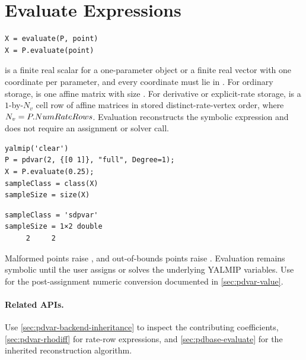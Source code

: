 \section{Evaluate \texorpdfstring{}{pdvar} Expressions}
\label{sec:pdvar-evaluate}

\syntaxhead
\begin{lstlisting}[style=dpsyntax]
X = evaluate(P, point)
X = P.evaluate(point)
\end{lstlisting}

\descriptionhead
{} is a finite real scalar for a one-parameter object or a finite real vector with one coordinate per parameter, and every coordinate must lie in . For ordinary storage,  is one affine  matrix with size . For derivative or explicit-rate storage,  is a $1$-by-$N_v$ cell row of affine matrices in stored distinct-rate-vertex order, where $N_v=P.NumRateRows$. Evaluation reconstructs the symbolic expression and does not require an assignment or solver call.

\par\examplehead
\begin{lstlisting}[style=dpmatlab]
yalmip('clear')
P = pdvar(2, {[0 1]}, "full", Degree=1);
X = P.evaluate(0.25);
sampleClass = class(X)
sampleSize = size(X)
\end{lstlisting}
\begin{lstlisting}[style=dpoutput]
sampleClass = 'sdpvar'
sampleSize = 1×2 double
     2     2
\end{lstlisting}

\remarkshead
Malformed points raise , and out-of-bounds points raise . Evaluation remains symbolic until the user assigns or solves the underlying YALMIP variables. Use  for the post-assignment numeric conversion documented in \cref{sec:pdvar-value}.

\paragraph{Related APIs.}
Use \cref{sec:pdvar-backend-inheritance} to inspect the contributing coefficients, \cref{sec:pdvar-rhodiff} for rate-row expressions, and \cref{sec:pdbase-evaluate} for the inherited reconstruction algorithm.

\section{\texorpdfstring{}{rhodiff}}
\label{sec:pdvar-rhodiff}


